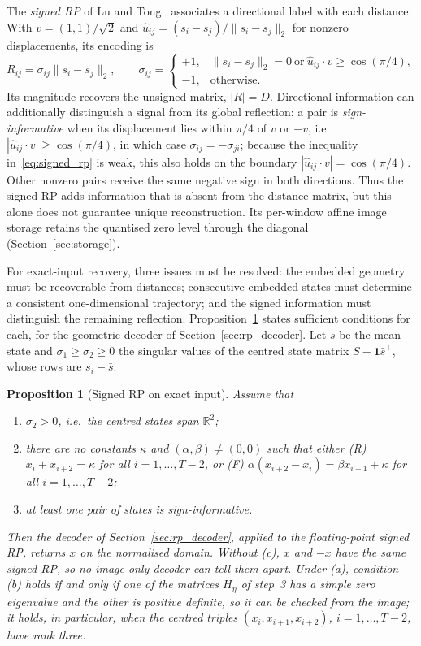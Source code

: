 \documentclass[preprint,review,12pt]{elsarticle}
\newtheorem{proposition}{Proposition}
\begin{document}
The \emph{signed RP} of Lu and Tong~\cite{lu2019robust} associates a directional label with each distance. With $v=(1,1)/\sqrt2$ and $\hat u_{ij}=(s_i-s_j)/\lVert s_i-s_j\rVert_2$ for nonzero displacements, its encoding is
\begin{equation}
R_{ij}=\sigma_{ij}\lVert s_i-s_j\rVert_2,\qquad
\sigma_{ij}=\begin{cases}
+1,&\lVert s_i-s_j\rVert_2=0\ \text{or}\ \hat u_{ij}\cdot v\ge\cos(\pi/4),\\
-1,&\text{otherwise}.
\end{cases}
\label{eq:signed_rp}
\end{equation}
Its magnitude recovers the unsigned matrix, $|R|=D$. Directional information can additionally distinguish a signal from its global reflection: a pair is \emph{sign-informative} when its displacement lies within $\pi/4$ of $v$ or $-v$, i.e.\ $|\hat u_{ij}\cdot v|\ge\cos(\pi/4)$, in which case $\sigma_{ij}=-\sigma_{ji}$; because the inequality in~\eqref{eq:signed_rp} is weak, this also holds on the boundary $|\hat u_{ij}\cdot v|=\cos(\pi/4)$. Other nonzero pairs receive the same negative sign in both directions. Thus the signed RP adds information that is absent from the distance matrix, but this alone does not guarantee unique reconstruction. Its per-window affine image storage retains the quantised zero level through the diagonal (Section~\ref{sec:storage}).

For exact-input recovery, three issues must be resolved: the embedded geometry must be recoverable from distances; consecutive embedded states must determine a consistent one-dimensional trajectory; and the signed information must distinguish the remaining reflection. Proposition~\ref{prop:rp} states sufficient conditions for each, for the geometric decoder of Section~\ref{sec:rp_decoder}. Let $\bar s$ be the mean state and $\sigma_1\ge\sigma_2\ge0$ the singular values of the centred state matrix $S-\mathbf 1\bar s^\top$, whose rows are $s_i-\bar s$.

\begin{proposition}[Signed RP on exact input]\label{prop:rp}
Assume that
\begin{enumerate}
\item[(a)] $\sigma_2>0$, i.e.\ the centred states span $\mathbb R^2$;
\item[(b)] there are no constants $\kappa$ and $(\alpha,\beta)\neq(0,0)$ such that either \emph{(R)} $x_i+x_{i+2}=\kappa$ for all $i=1,\ldots,T-2$, or \emph{(F)} $\alpha(x_{i+2}-x_i)=\beta x_{i+1}+\kappa$ for all $i=1,\ldots,T-2$;
\item[(c)] at least one pair of states is sign-informative.
\end{enumerate}
Then the decoder of Section~\ref{sec:rp_decoder}, applied to the floating-point signed RP, returns $x$ on the normalised domain. Without (c), $x$ and $-x$ have the same signed RP, so no image-only decoder can tell them apart. Under (a), condition (b) holds if and only if one of the matrices $H_\eta$ of step~3 has a simple zero eigenvalue and the other is positive definite, so it can be checked from the image; it holds, in particular, when the centred triples $(x_i,x_{i+1},x_{i+2})$, $i=1,\ldots,T-2$, have rank three.
\end{proposition}
\end{document}
